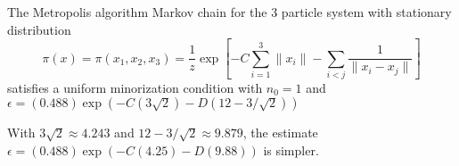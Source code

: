 \documentclass[12pt]{article}
\begin{document}
\begin{lemma}
    The Metropolis algorithm Markov chain for the \( 3 \) particle
    system with stationary distribution
    \[
        \pi(x) = \pi(x_1,x_2,x_3) = \frac{1}{z} \exp\left[ -C \sum\limits_
        {i=1}^3 \|x_i\| - \sum\limits_{i<j} \frac{1}{\| x_i - x_j \|}
        \right]
    \] satisfies a uniform minorization condition with \( n_0 = 1 \) and
    \( \epsilon = (0.488) \exp(-C(3 \sqrt{2}) - D(12 - 3/ \sqrt{2})) \)
\end{lemma}

\begin{remark}

\end{remark}
With \( 3 \sqrt{2} \approx 4.243 \) and \( 12 - 3/\sqrt{2} \approx 9.879
\), the estimate \( \epsilon = (0.488) \exp(-C(4.25) - D(9.88)) \) is
simpler.
\end{document}
